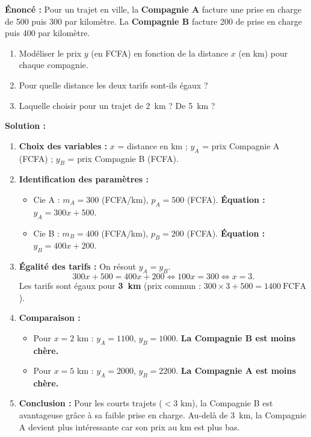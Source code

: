 \documentclass[11pt]{article}
\begin{document}
\begin{exemplebox}
\textbf{Énoncé :} Pour un trajet en ville, la \textbf{Compagnie A} facture une prise en charge de \SI{500}{} puis \SI{300}{} par kilomètre. La \textbf{Compagnie B} facture \SI{200}{} de prise en charge puis \SI{400}{} par kilomètre.
\begin{enumerate}
    \item Modéliser le prix $y$ (en FCFA) en fonction de la distance $x$ (en km) pour chaque compagnie.
    \item Pour quelle distance les deux tarifs sont-ils égaux ?
    \item Laquelle choisir pour un trajet de \SI{2}{km} ? De \SI{5}{km} ?
\end{enumerate}

\textbf{Solution :}
\begin{enumerate}
    \item \textbf{Choix des variables :} $x$ = distance en km ; $y_A$ = prix Compagnie A (FCFA) ; $y_B$ = prix Compagnie B (FCFA).
    \item \textbf{Identification des paramètres :}
    \begin{itemize}
        \item Cie A : $m_A = 300$ (FCFA/km), $p_A = 500$ (FCFA). \textbf{Équation :} $y_A = 300x + 500$.
        \item Cie B : $m_B = 400$ (FCFA/km), $p_B = 200$ (FCFA). \textbf{Équation :} $y_B = 400x + 200$.
    \end{itemize}
    \item \textbf{Égalité des tarifs :} On résout $y_A = y_B$.
    \[
    300x + 500 = 400x + 200 \iff 100x = 300 \iff x = 3.
    \]
    Les tarifs sont égaux pour \textbf{\SI{3}{km}} (prix commun : $300 \times 3 + 500 = \SI{1400}{\text{FCFA}}$).
    \item \textbf{Comparaison :}
    \begin{itemize}
        \item Pour $x = 2$ km : $y_A = 1100$, $y_B = 1000$. \textbf{La Compagnie B est moins chère.}
        \item Pour $x = 5$ km : $y_A = 2000$, $y_B = 2200$. \textbf{La Compagnie A est moins chère.}
    \end{itemize}
    \item \textbf{Conclusion :} Pour les courts trajets ($< 3$ km), la Compagnie B est avantageuse grâce à sa faible prise en charge. Au-delà de \SI{3}{km}, la Compagnie A devient plus intéressante car son prix au km est plus bas.
\end{enumerate}
\end{exemplebox}
\end{document}
